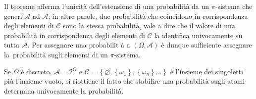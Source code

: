 \documentclass{article}
\begin{document}
Il teorema afferma l'unicit\`{a} dell'estensione di una probabilit\`{a} da
un $\pi $-sistema che generi $\mathcal{A}$ ad $\mathcal{A}$; in altre
parole, due probabilit\`{a} che coincidono in corrispondenza degli elementi
di $\mathcal{C}$ sono la stessa probabilit\`{a}, vale a dire che il valore
di una probabilit\`{a} in corrispondenza degli elementi di $\mathcal{C}$ la
identifica univocamente su tutta $\mathcal{A}$. Per assegnare una probabilit%
\`{a} a $\left( \Omega ,\mathcal{A}\right) $ \`{e} dunque sufficiente
assegnare la\ probabilit\`{a} sugli elementi di un $\pi $-sistema.

Se $\Omega $ \`{e} discreto, $\mathcal{A}=2^{\Omega }$ e $\mathcal{C=}%
\left\{ \varnothing ,\left\{ \omega _{1}\right\} ,\left\{ \omega
_{n}\right\} ...\right\} $ \`{e} l'insieme dei singoletti pi\`{u} l'insieme
vuoto, si riottiene il fatto che stabilire una probabilit\`{a} sugli atomi
determina univocamente la probabilit\`{a}.
\end{document}
